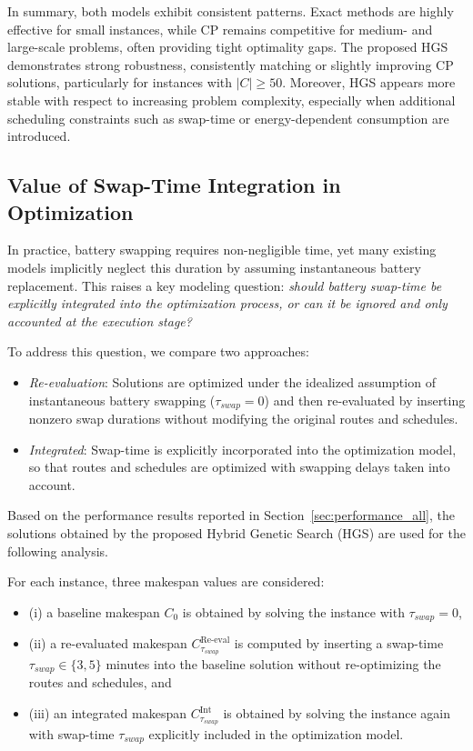 \documentclass[3p, authoryear, 11pt]{elsarticle}
\begin{document}
In summary, both models exhibit consistent patterns. Exact methods are highly effective for small instances, while CP remains competitive for medium- and large-scale problems, often providing tight optimality gaps. The proposed HGS demonstrates strong robustness, consistently matching or slightly improving CP solutions, particularly for instances with $|C| \geq 50$. Moreover, HGS appears more stable with respect to increasing problem complexity, especially when additional scheduling constraints such as swap-time or energy-dependent consumption are introduced.

\subsection{Value of Swap-Time Integration in Optimization}
\label{sec:value_of_swap_time_integration}

In practice, battery swapping requires non-negligible time, yet many  existing models implicitly neglect this duration by assuming instantaneous battery replacement. This raises a key modeling question:
\textit{should battery swap-time be explicitly integrated into the optimization process, or can it be ignored and only accounted at the execution stage?}

To address this question, we compare two approaches:
\begin{itemize}
    \item \emph{Re-evaluation}: Solutions are optimized under the idealized assumption of instantaneous battery swapping ($\tau_{swap}=0$) and then re-evaluated by inserting nonzero swap durations without modifying the original routes and schedules.
    
    \item \emph{Integrated}: Swap-time is explicitly incorporated into the optimization model, so that routes and schedules are optimized with swapping delays taken into account.

\end{itemize}

Based on the performance results reported in Section~\ref{sec:performance_all}, the solutions obtained by the proposed Hybrid Genetic Search (HGS) are used for the following analysis. 

For each instance, three makespan values are considered:
\begin{itemize}
    \item (i) a baseline makespan $C_0$ is obtained by solving the instance with $\tau_{swap}=0$,
    \item (ii) a re-evaluated makespan $C^{\text{Re-eval}}_{\tau_{swap}}$ is computed by inserting a swap-time $\tau_{swap} \in \{3,5\}$ minutes into the baseline solution without re-optimizing the routes and schedules, and
    \item (iii) an integrated makespan $C^{\text{Int}}_{\tau_{swap}}$ is obtained by solving the instance again with swap-time $\tau_{swap}$ explicitly included in the optimization model.
\end{itemize}
\end{document}
